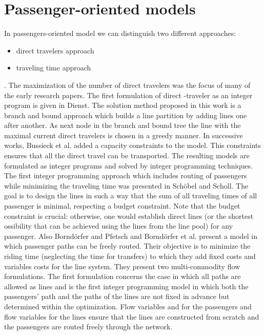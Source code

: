 \documentclass[
  twoside,
  11pt, a4paper,
  footinclude=true,
  headinclude=true,
  cleardoublepage=empty
]{scrbook}
\theoremstyle{definition}
\begin{document}
\section{Passenger-oriented models}
In passengers-oriented model we can distinguish two different approaches:
\begin{itemize}
\item direct travelers approach
\item traveling time approach
\end{itemize}.
The maximization of the number of direct travelers was the focus of many of the early research papers. The first formulation of direct -traveler as an integer program is given in Dienst. The solution method proposed in this work is a branch and bound approach which builds a line partition by adding lines one after another. As next node in the branch and bound tree the line with the maximal current direct travelers is chosen in a greedy manner. In successive works, Bussieck et al. added a capacity constraints to the model. This constraints ensures that all the direct travel can be transported. The resulting models are formulated as integer programs and solved by integer programming techniques. \newline
The first integer programming approach which includes routing of passengers while minimizing the traveling time was presented in Sch\"{o}bel and Scholl. The goal is to design the lines in such a way that the sum of all traveling times of all passenger is minimal, respecting a budget constraint. Note that the budget constraint is crucial: otherwise, one would establish direct lines (or the shortest ossibility that can be achieved using the lines from the line pool) for any passenger. \newline
Also Bornd\"{o}rfer and Pfetsch and Bornd\"{o}rfer et al. present a model in which passenger paths can be freely routed. Their objective is to minimize the riding time (neglecting the time for transfers) to which they add fixed costs and variables costs for the line system. They present two multi-commodity flow formulations. \newline
The first formulation concerns the case in which all paths are allowed as lines and is the first integer programming model in which both the passengers' path and the paths of the lines are not fixed in advance but determined within the optimization. Flow variables and for the passengers and flow variables for the lines ensure that the lines are constructed from scratch and the passengers are routed freely through the network. \newline
\end{document}
